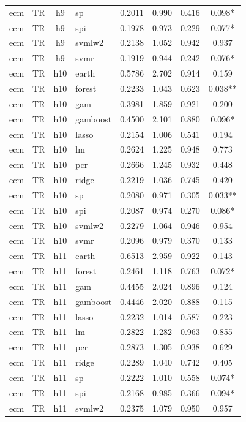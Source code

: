 \begin{ThreePartTable}
\begin{longtable}[t]{llclcccc}
ecm & TR & h9 & sp & 0.2011 & 0.990 & 0.416 & 0.098*\\
ecm & TR & h9 & spi & 0.1978 & 0.973 & 0.229 & 0.077*\\
ecm & TR & h9 & svmlw2 & 0.2138 & 1.052 & 0.942 & 0.937\\
ecm & TR & h9 & svmr & 0.1919 & 0.944 & 0.242 & 0.076*\\
\addlinespace
ecm & TR & h10 & earth & 0.5786 & 2.702 & 0.914 & 0.159\\
ecm & TR & h10 & forest & 0.2233 & 1.043 & 0.623 & 0.038**\\
ecm & TR & h10 & gam & 0.3981 & 1.859 & 0.921 & 0.200\\
ecm & TR & h10 & gamboost & 0.4500 & 2.101 & 0.880 & 0.096*\\
ecm & TR & h10 & lasso & 0.2154 & 1.006 & 0.541 & 0.194\\
ecm & TR & h10 & lm & 0.2624 & 1.225 & 0.948 & 0.773\\
ecm & TR & h10 & pcr & 0.2666 & 1.245 & 0.932 & 0.448\\
ecm & TR & h10 & ridge & 0.2219 & 1.036 & 0.745 & 0.420\\
ecm & TR & h10 & sp & 0.2080 & 0.971 & 0.305 & 0.033**\\
ecm & TR & h10 & spi & 0.2087 & 0.974 & 0.270 & 0.086*\\
ecm & TR & h10 & svmlw2 & 0.2279 & 1.064 & 0.946 & 0.954\\
ecm & TR & h10 & svmr & 0.2096 & 0.979 & 0.370 & 0.133\\
\addlinespace
ecm & TR & h11 & earth & 0.6513 & 2.959 & 0.922 & 0.143\\
ecm & TR & h11 & forest & 0.2461 & 1.118 & 0.763 & 0.072*\\
ecm & TR & h11 & gam & 0.4455 & 2.024 & 0.896 & 0.124\\
ecm & TR & h11 & gamboost & 0.4446 & 2.020 & 0.888 & 0.115\\
ecm & TR & h11 & lasso & 0.2232 & 1.014 & 0.587 & 0.223\\
ecm & TR & h11 & lm & 0.2822 & 1.282 & 0.963 & 0.855\\
ecm & TR & h11 & pcr & 0.2873 & 1.305 & 0.938 & 0.629\\
ecm & TR & h11 & ridge & 0.2289 & 1.040 & 0.742 & 0.405\\
ecm & TR & h11 & sp & 0.2222 & 1.010 & 0.558 & 0.074*\\
ecm & TR & h11 & spi & 0.2168 & 0.985 & 0.366 & 0.094*\\
ecm & TR & h11 & svmlw2 & 0.2375 & 1.079 & 0.950 & 0.957\\

\end{longtable}
\end{ThreePartTable}
